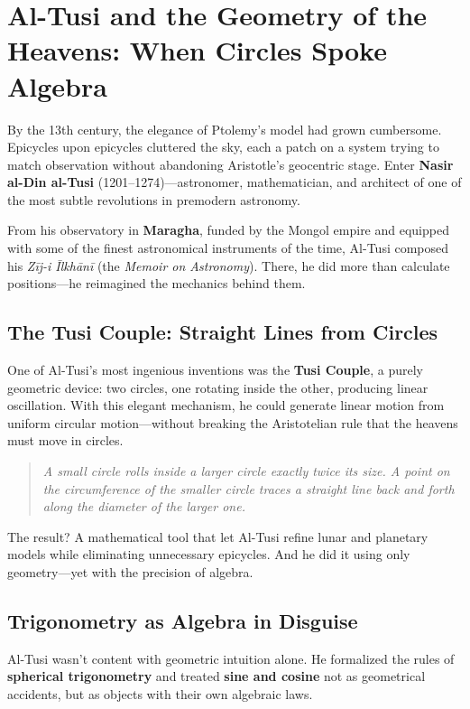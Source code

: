 \section{Al-Tusi and the Geometry of the Heavens: When Circles Spoke Algebra}

By the 13th century, the elegance of Ptolemy’s model had grown cumbersome. Epicycles upon epicycles cluttered the sky, each a patch on a system trying to match observation without abandoning Aristotle’s geocentric stage. Enter \textbf{Nasir al-Din al-Tusi} (1201–1274)—astronomer, mathematician, and architect of one of the most subtle revolutions in premodern astronomy.

From his observatory in \textbf{Maragha}, funded by the Mongol empire and equipped with some of the finest astronomical instruments of the time, Al-Tusi composed his \textit{Zīj-i Īlkhānī} (the \textit{Memoir on Astronomy}). There, he did more than calculate positions—he reimagined the mechanics behind them.

\subsection{The Tusi Couple: Straight Lines from Circles}

One of Al-Tusi’s most ingenious inventions was the \textbf{Tusi Couple}, a purely geometric device: two circles, one rotating inside the other, producing linear oscillation. With this elegant mechanism, he could generate linear motion from uniform circular motion—without breaking the Aristotelian rule that the heavens must move in circles.

\begin{quote}
\textit{A small circle rolls inside a larger circle exactly twice its size. A point on the circumference of the smaller circle traces a straight line back and forth along the diameter of the larger one.}
\end{quote}

The result? A mathematical tool that let Al-Tusi refine lunar and planetary models while eliminating unnecessary epicycles. And he did it using only geometry—yet with the precision of algebra.

\subsection{Trigonometry as Algebra in Disguise}

Al-Tusi wasn’t content with geometric intuition alone. He formalized the rules of \textbf{spherical trigonometry} and treated \textbf{sine and cosine} not as geometrical accidents, but as objects with their own algebraic laws.


